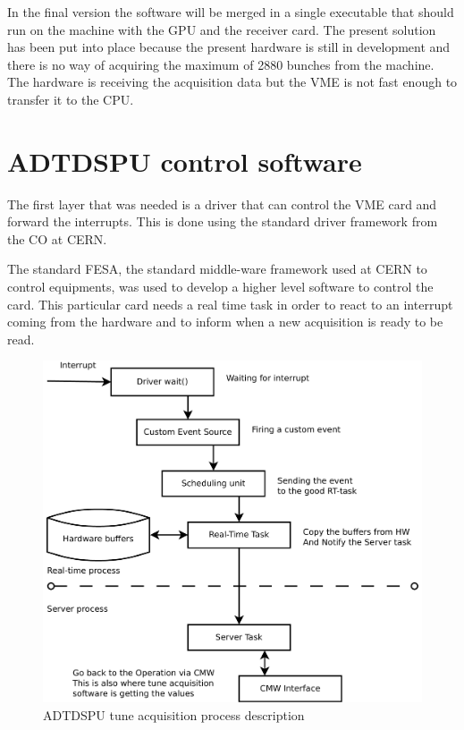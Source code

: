 In the final version the software will be merged in a single executable that should run on the machine with the \gls{GPU} and the receiver card. The present solution has been put into place because the present hardware is still in development and there is no way of acquiring the maximum of 2880 bunches from the machine. The hardware is receiving the acquisition data but the \gls{VME} is not fast enough to transfer it to the \gls{CPU}.

\section{ADTDSPU control software}

The first layer that was needed is a driver that can control the \gls{VME} card and forward the interrupts. This is done using the standard driver framework from the \gls{CO} at \gls{CERN}.

The standard \gls{FESA}, the standard middle-ware framework used at \gls{CERN} to control equipments, was used to develop a higher level software to control the card. This particular card needs a real time task in order to react to an interrupt coming from the hardware and to inform when a new acquisition is ready to be read.

\begin{figure}[H]
\caption{ADTDSPU tune acquisition process description}
\centering
\includegraphics[scale=0.3]{adtdspu_acq.pdf}
\end{figure}

